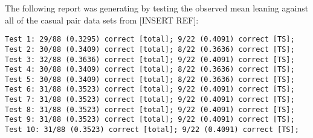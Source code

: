 \documentclass[a4paper,11pt]{article}
\begin{document}
The following report was generating by testing the observed mean leaning against all of the casual pair data sets from [INSERT REF]:
\begin{verbatim}
Test 1: 29/88 (0.3295) correct [total]; 9/22 (0.4091) correct [TS];
Test 2: 30/88 (0.3409) correct [total]; 8/22 (0.3636) correct [TS];
Test 3: 32/88 (0.3636) correct [total]; 9/22 (0.4091) correct [TS];
Test 4: 30/88 (0.3409) correct [total]; 8/22 (0.3636) correct [TS];
Test 5: 30/88 (0.3409) correct [total]; 8/22 (0.3636) correct [TS];
Test 6: 31/88 (0.3523) correct [total]; 9/22 (0.4091) correct [TS];
Test 7: 31/88 (0.3523) correct [total]; 9/22 (0.4091) correct [TS];
Test 8: 31/88 (0.3523) correct [total]; 9/22 (0.4091) correct [TS];
Test 9: 31/88 (0.3523) correct [total]; 9/22 (0.4091) correct [TS];
Test 10: 31/88 (0.3523) correct [total]; 9/22 (0.4091) correct [TS];
\end{verbatim}
\end{document}
